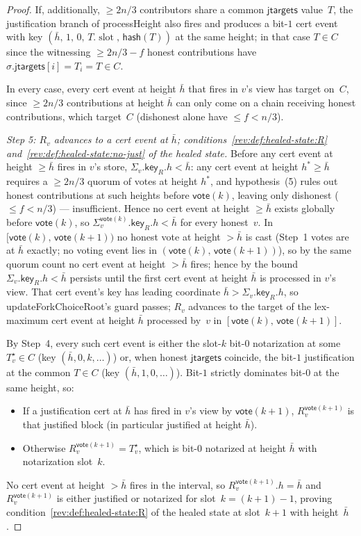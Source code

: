 \documentclass{article}
\newcommand{\slot}[0]{\ensuremath{\operatorname{\mathrm{slot}}}}
\newcommand{\jtargets}{\mathsf{jtargets}}
\newcommand{\hash}{\mathsf{hash}}
\newcommand{\key}{\mathsf{key}}
\newcommand{\vote}{\mathsf{vote}}
\newcommand{\comm}[1]{\bar{#1}}
\newcommand{\processHeight}{\textsf{processHeight}\xspace}
\newcommand{\updateForkChoiceRoot}{\textsf{updateForkChoiceRoot}\xspace}
\theoremstyle{plain}
\theoremstyle{definition}
\theoremstyle{remark}
\begin{document}
\begin{proof}
If, additionally, $\geq 2n/3$ contributors share a common $\jtargets$ value~$T$, the justification branch of \processHeight{} also fires and produces a bit-$1$ cert event with key $(\comm{h},\, 1,\, 0,\, T.\slot,\, \hash(T))$ at the same height; in that case $T \in C$ since the witnessing $\geq 2n/3 - f$ honest contributions have $\sigma.\jtargets[i] = T_i = T \in C$.

In every case, every cert event at height $\comm{h}$ that fires in $v$'s view has target on~$C$, since $\geq 2n/3$ contributions at height $\comm{h}$ can only come on a chain receiving honest contributions, which target~$C$ (dishonest alone have $\leq f < n/3$).

\emph{Step 5: $R_v$ advances to a cert event at $\comm{h}$; conditions~\ref{rev:def:healed-state:R} and~\ref{rev:def:healed-state:no-just} of the healed state.}
Before any cert event at height $\geq \comm{h}$ fires in $v$'s store, $\Sigma_v.\key_R.h < \comm{h}$: any cert event at height $h^* \geq \comm{h}$ requires a $\geq 2n/3$ quorum of votes at height $h^*$, and hypothesis~(5) rules out honest contributions at such heights before $\vote(k)$, leaving only dishonest ($\leq f < n/3$) --- insufficient. Hence no cert event at height $\geq \comm{h}$ exists globally before $\vote(k)$, so $\Sigma_v^{\vote(k)}.\key_R.h < \comm{h}$ for every honest~$v$.
In $[\vote(k),\, \vote(k+1))$ no honest vote at height $> \comm{h}$ is cast (Step~1 votes are at $\comm{h}$ exactly; no voting event lies in $(\vote(k),\, \vote(k+1))$), so by the same quorum count no cert event at height $> \comm{h}$ fires; hence by  the bound $\Sigma_v.\key_R.h < \comm{h}$ persists until the first cert event at height $\comm{h}$ is processed in $v$'s view.
That cert event's key has leading coordinate $\comm{h} > \Sigma_v.\key_R.h$, so \updateForkChoiceRoot{}'s guard passes; $R_v$ advances to the target of the lex-maximum cert event at height $\comm{h}$ processed by~$v$ in $[\vote(k),\, \vote(k+1)]$.

By Step~4, every such cert event is either the slot-$k$ bit-$0$ notarization at some $T^\star_v \in C$ (key $(\comm{h}, 0, k, \ldots)$) or, when honest $\jtargets$ coincide, the bit-$1$ justification at the common $T \in C$ (key $(\comm{h}, 1, 0, \ldots)$). Bit-$1$ strictly dominates bit-$0$ at the same height, so:
\begin{itemize}
  \item If a justification cert at $\comm{h}$ has fired in $v$'s view by $\vote(k+1)$, $R_v^{\vote(k+1)}$ is that justified block (in particular justified at height $\comm{h}$).
  \item Otherwise $R_v^{\vote(k+1)} = T^\star_v$, which is bit-$0$ notarized at height $\comm{h}$ with notarization slot~$k$.
\end{itemize}
No cert event at height $> \comm{h}$ fires in the interval, so $R_v^{\vote(k+1)}.h = \comm{h}$ and $R_v^{\vote(k+1)}$ is either justified or notarized for slot~$k = (k+1)-1$, proving condition~\ref{rev:def:healed-state:R} of the healed state at slot~$k+1$ with height~$\comm{h}$.


\end{proof}
\end{document}
